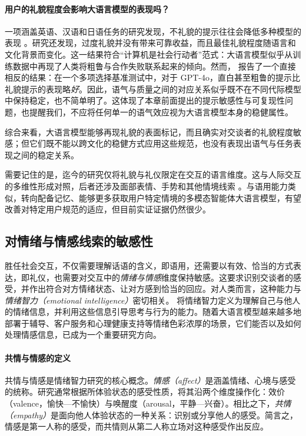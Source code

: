 \paragraph{用户的礼貌程度会影响大语言模型的表现吗？} \label{sec:politeness}
一项涵盖英语、汉语和日语任务的研究发现，不礼貌的提示往往会降低多种模型的表现 \citep{yin-etal-2024-respect}。研究还发现，过度礼貌并没有带来可靠收益，而且最佳礼貌程度随语言和文化背景而变化。这一结果符合“计算机是社会行动者”范式：大语言模型似乎从训练数据中再现了人类将粗鲁与合作失败联系起来的倾向。然而，\citet{dobariya2025tone} 报告了一个直接相反的结果：在一个多项选择基准测试中，对于 GPT-4o，直白甚至粗鲁的提示比礼貌提示的表现略\emph{好}。因此，语气与质量之间的对应关系似乎既不在不同代际模型中保持稳定，也不简单明了。这体现了本章前面提出的提示敏感性与可复现性问题，也提醒我们，不应将任何单一的语气效应视为大语言模型本身的稳健属性。

综合来看，大语言模型能够再现礼貌的表面标记，而且确实对交谈者的礼貌程度敏感；但它们既不能以跨文化的稳健方式应用这些规范，也没有表现出语气与任务表现之间的稳定关系。

需要记住的是，迄今的研究仅将礼貌与礼仪限定在交互的语言维度。这与人际交互的多维性形成对照，后者还涉及面部表情、手势和其他情境线索 \citep{brown1987politeness}。与语用能力类似，转向配备记忆、能够更多获取用户特定情境的多模态智能体大语言模型，有望改善对特定用户规范的适应，但目前实证证据仍然很少。

\subsection{对情绪与情感线索的敏感性} \label{sec:empathy}
胜任社会交互，不仅需要理解话语的含义，即语用，还需要以有效、恰当的方式表达，即礼仪，也需要对交互中的\emph{情绪与情感}维度保持敏感。这要求识别交谈者的感受，并作出符合对方情绪状态、让对方感到恰当的回应。对人类而言，这种能力与\emph{情绪智力（emotional intelligence）}密切相关。\citet{salovey1990emotional} 将情绪智力定义为理解自己与他人的情绪信息，并利用这些信息引导思考与行为的能力。随着大语言模型越来越多地部署于辅导、客户服务和心理健康支持等情绪色彩浓厚的场景，它们能否以及如何处理情感信息，已成为一个重要研究方向。

\paragraph{共情与情感的定义}
共情与情感是情绪智力研究的核心概念。\emph{情感（affect）}是涵盖情绪、心境与感受的统称。研究通常根据所体验状态的感受性质，将其沿两个维度操作化：效价（valence，愉快—不愉快）与唤醒度（arousal，平静—兴奋）\citep{russell1980circumplex}。相比之下，\emph{共情（empathy）}是面向他人体验状态的一种关系：识别或分享他人的感受。简言之，情感是第一人称的感受，而共情则从第二人称立场对这种感受作出反应。

